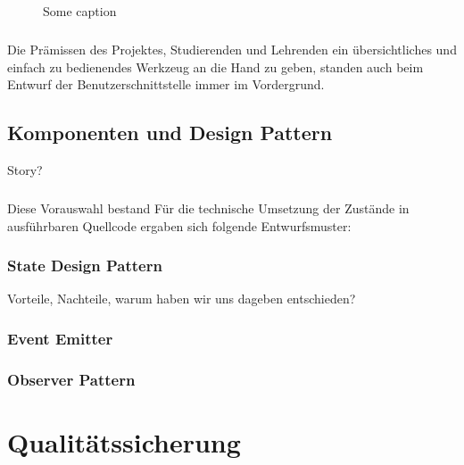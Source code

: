 \begin{figure}[h]
	\centering
	\caption{Some caption}
	\label{UI_final}
\end{figure}

\paragraph{}Die Prämissen des Projektes, Studierenden und Lehrenden ein übersichtliches und einfach zu bedienendes Werkzeug an die Hand zu geben, standen auch beim Entwurf der Benutzerschnittstelle immer im Vordergrund.

\section{Komponenten und Design Pattern}
Story? 

\paragraph{}Diese Vorauswahl bestand
Für die technische Umsetzung der Zustände in ausführbaren Quellcode ergaben sich folgende Entwurfsmuster:
\subsection*{State Design Pattern}
Vorteile, Nachteile, warum haben wir uns dageben entschieden?

\subsection*{Event Emitter}
\subsection*{Observer Pattern}


\chapter{Qualitätssicherung}
